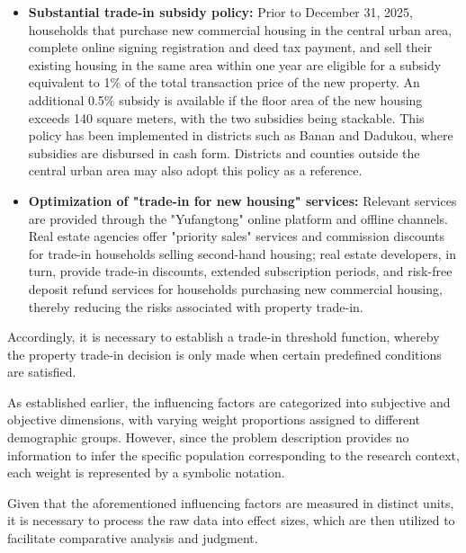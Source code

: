 \documentclass{mcmthesis}
\begin{document}
\begin{itemize}
    \item \textbf{Substantial trade-in subsidy policy:}
    Prior to December 31, 2025, households that purchase new commercial housing in the central urban area, 
    complete online signing registration and deed tax payment, 
    and sell their existing housing in the same area within one year are eligible 
    for a subsidy equivalent to 1\% of the total transaction price of the new property. An additional 0.5\% subsidy 
    is available if the floor area of the new housing exceeds 140 square meters, with the two subsidies being stackable. 
    This policy has been implemented in districts such as Banan and Dadukou, where subsidies are disbursed in cash form. 
    Districts and counties outside the central urban area may also adopt this policy as a reference.

    \item \textbf{Optimization of "trade-in for new housing" services:}
    Relevant services are provided through the "Yufangtong" online platform and offline channels. 
    Real estate agencies offer "priority sales" services and commission discounts for trade-in households 
    selling second-hand housing; real estate developers, in turn, provide trade-in discounts, extended subscription periods, 
    and risk-free deposit refund services for households purchasing new commercial housing, thereby reducing 
    the risks associated with property trade-in.

\end{itemize}

Accordingly, it is necessary to establish a trade-in threshold function, 
whereby the property trade-in decision is only made when certain predefined conditions are satisfied.

As established earlier, the influencing factors are categorized into subjective and objective dimensions, 
with varying weight proportions assigned to different demographic groups. However, 
since the problem description provides no information to infer the specific population corresponding to the research context, 
each weight is represented by a symbolic notation.

Given that the aforementioned influencing factors are measured in distinct units, 
it is necessary to process the raw data into effect sizes, 
which are then utilized to facilitate comparative analysis and judgment.
\end{document}
